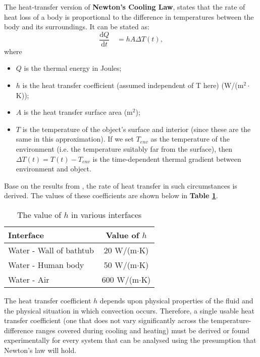 \documentclass[12pt]{article}
\begin{document}
The heat-transfer version of \textbf{Newton's Cooling Law}, states that the rate of heat loss of a
body is proportional to the difference in temperatures between the body and its surroundings. It can
be stated as:
\begin{equation}\label{n}
\frac{\mathrm{d}Q}{\mathrm{d}t}\quad=hA\Delta T(t),
\end{equation}
where
\begin{itemize}
    \item $Q$ is the thermal energy in Joules;
    \item $h$ is the heat transfer coefficient (assumed independent of T here) (W/(m$^2\cdot$K));
    \item $A$ is the heat transfer surface area (m$^2$);
    \item $T$ is the temperature of the object's surface and interior (since these are the same in
    this approximation). If we set $T_{env}$ as the temperature of the environment (i.e. the
    temperature suitably far from the surface), then $\Delta T(t)=T(t)-T_{env} $ is the
    time-dependent thermal gradient between environment and object.
\end{itemize}

Base on the results from \cite{11}, the rate of heat transfer in such circumstances is derived. The
values of these coefficients are shown below in \textbf{Table \ref{h}}.
\begin{table}[!htbp]
\begin{center}
\caption{The value of $h$ in various interfaces}
\begin{tabular}{lc}
    \toprule
    Interface& Value of $h$\\
    \midrule
    Water - Wall of bathtub&20 W/(m$\cdot$K)\\
    Water - Human body&50 W/(m$\cdot$K)\\
    Water - Air&600 W/(m$\cdot$K)\\
    \bottomrule
\end{tabular}\label{h}
\end{center}
\end{table}

The heat transfer coefficient $h$ depends upon physical properties of the fluid and the physical
situation in which convection occurs. Therefore, a single usable heat transfer coefficient (one that
does not vary significantly across the temperature-difference ranges covered during cooling and
heating) must be derived or found experimentally for every system that can be analysed using the
presumption that Newton's law will hold.
\end{document}
